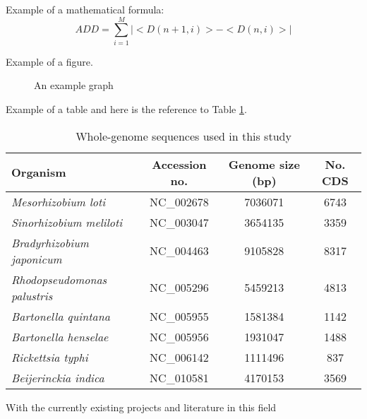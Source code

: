 Example of a mathematical formula:
\begin{equation}
  ADD = \sum_{i=1}^{M}|<D(n+1,i)>-<D(n,i)>|
  \label{add}
\end{equation}

Example of a figure.
\begin{figure}[ht!]
\begin{center}
\end{center}
\caption{An example graph}
\label{graph1}
\end{figure}

Example of a table and here is the reference to Table \ref{table_genomes}. 

\begin{table}
\begin{center}
\begin{tabular}{|l|c|c|c|}
\hline
{\sc Organism}  &  {\sc Accession no.}  & {\sc Genome size} (bp)  & {\sc No. CDS} \\
\hline
{\it Mesorhizobium loti}          & NC\_002678 & 7036071 & 6743 \\
\hline
{\it Sinorhizobium meliloti}      & NC\_003047 & 3654135 & 3359 \\
\hline
{\it Bradyrhizobium japonicum}    & NC\_004463 & 9105828 & 8317 \\
\hline
{\it Rhodopseudomonas palustris}  & NC\_005296 & 5459213 & 4813 \\
\hline
{\it Bartonella quintana}         & NC\_005955 & 1581384 & 1142 \\
\hline
{\it Bartonella henselae}         & NC\_005956 & 1931047 & 1488 \\
\hline
{\it Rickettsia typhi}            & NC\_006142 & 1111496 & 837 \\
\hline
{\it Beijerinckia indica}         & NC\_010581 & 4170153 & 3569 \\
\hline
\end{tabular}
\end{center}
\caption{Whole-genome sequences used in this study}
\label{table_genomes}
\end{table}

With the currently existing projects and literature in this field
